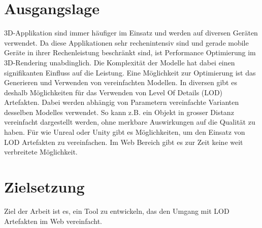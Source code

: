 \section{Ausgangslage}
3D-Applikation sind immer häufiger im Einsatz und werden auf diversen Geräten verwendet. Da diese Applikationen sehr rechenintensiv sind und gerade mobile Geräte in ihrer Rechenleistung beschränkt sind, ist Performance Optimierung im 3D-Rendering unabdinglich. Die Komplexität der Modelle hat dabei einen signifikanten Einfluss auf die Leistung.
Eine Möglichkeit zur Optimierung ist das Generieren und Verwenden von vereinfachten Modellen. In diversen  gibt es deshalb Möglichkeiten für das Verwenden von Level Of Details (LOD) Artefakten. Dabei werden abhängig von Parametern vereinfachte Varianten desselben Modelles verwendet. So kann z.B. ein Objekt in grosser Distanz vereinfacht dargestellt werden, ohne merkbare Auswirkungen auf die Qualität zu haben.
Für  wie Unreal oder Unity gibt es Möglichkeiten, um den Einsatz von LOD Artefakten zu vereinfachen. Im Web Bereich gibt es zur Zeit keine weit verbreitete Möglichkeit.

\section{Zielsetzung}
Ziel der Arbeit ist es, ein Tool zu entwickeln, das den Umgang mit LOD Artefakten im Web vereinfacht.
